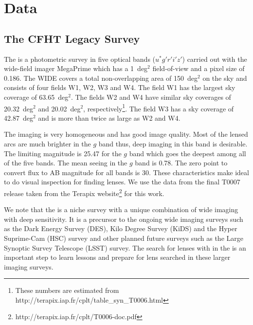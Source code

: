 \documentclass[useAMS,usenatbib,a4paper]{mn2e}
\begin{document}

\section{Data}
\label{sec:data}
\subsection{The CFHT Legacy Survey}
\label{sec:data:cfhtls}

The \cfhtls is a photometric survey in five optical bands
($u^*g'r'i'z'$) carried out with the wide-field imager MegaPrime which
has a 1~deg$^2$ field-of-view and a pixel size of 0.186\arcsec. The
\cfhtls \textsc{WIDE} covers a total non-overlapping area of 150~deg$^2$
on the sky and consists of four fields W1, W2, W3 and W4. The field W1
has the largest sky coverage of 63.65~deg$^2$. The fields W2 and W4 have
similar sky coverages of 20.32~deg$^2$ and 20.02~deg$^2$,
respectively\footnote{These numbers are estimated from
http://terapix.iap.fr/cplt/table\_syn\_T0006.html}.  The field W3 has a
sky coverage of 42.87~deg$^2$ and is more than twice as large as W2 and
W4.

The \cfhtls imaging is very homogeneous and has good image quality. Most of
the lensed arcs are much brighter in the $g$ band thus, deep imaging in
this band is desirable. The limiting magnitude is 25.47 for the $g$ band
which goes the deepest among all of the five bands. The mean seeing in
the $g$ band is 0.78\arcsec. The zero point to convert flux to AB
magnitude for all bands is 30. These characteristics make \cfhtls ideal
to do visual inspection for finding lenses.  We use the data from the
final T0007 release taken from the Terapix
website\footnote{{http://terapix.iap.fr/cplt/T0006-doc.pdf}}
for this work.

We note that the \cfhtls is a niche survey with a unique combination of wide
imaging with deep sensitivity. It is a precursor to the ongoing wide imaging
surveys such as the Dark Energy Survey (DES), Kilo Degree Survey (KiDS) and the
Hyper Suprime-Cam (HSC) survey and other planned future surveys such as the
Large Synoptic Survey Telescope (LSST) survey.  The search for lenses with \sw
in the \cfhtls is an important step to learn lessons and prepare for lens
searched in these larger imaging surveys.


\end{document}
